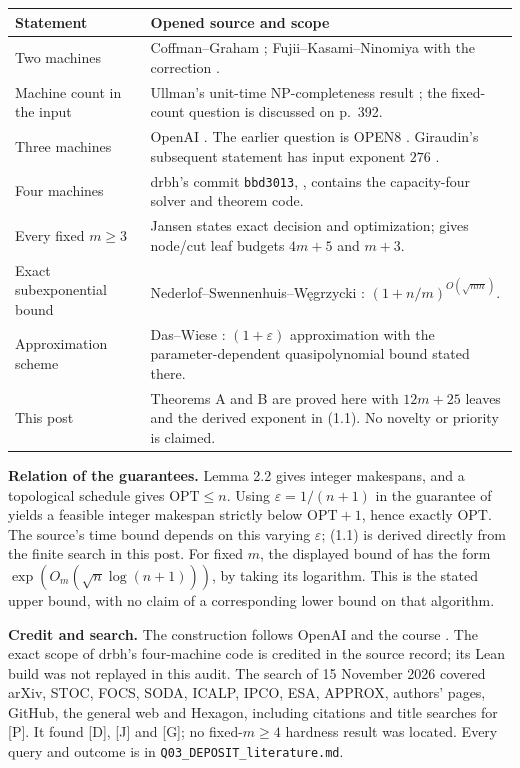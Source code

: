 \noindent\begin{tabularx}{\linewidth}{@{}L{4.0cm}Y@{}}
\toprule
Statement & Opened source and scope\\
\midrule
Two machines & Coffman--Graham \cite[Theorem~1, p.~203]{CG}; Fujii--Kasami--Ninomiya \cite[abstract]{FKN} with the correction \cite[p.~141]{FKNe}.\\[2pt]
Machine count in the input & Ullman's unit-time NP-completeness result \cite[Theorem~1, p.~389]{U}; the fixed-count question is discussed on p.~392.\\[2pt]
Three machines & OpenAI \cite[Theorem~1.1]{P}. The earlier question is OPEN8 \cite[Appendix A13, p.~287]{GJ}. Giraudin's subsequent statement has input exponent $276$ \cite[Theorem~1]{G}.\\[2pt]
Four machines & drbh's commit \texttt{bbd3013}, \cite[\texttt{Model.lean}, \texttt{ReleaseTheorem}; \texttt{Main.lean}, \texttt{main\_theorem}]{D}, contains the capacity-four solver and theorem code.\\[2pt]
Every fixed $m\geq3$ & Jansen \cite[Theorem~1.1]{J} states exact decision and optimization; \cite[Lemma~7.15]{J} gives node/cut leaf budgets $4m+5$ and $m+3$.\\[2pt]
Exact subexponential bound & Nederlof--Swennenhuis--W\k{e}grzycki \cite[Theorem~1.1]{N}: $(1+n/m)^{O(\sqrt{nm})}$.\\[2pt]
Approximation scheme & Das--Wiese \cite[Theorem~1]{A}: $(1+\varepsilon)$ approximation with the parameter-dependent quasipolynomial bound stated there.\\[2pt]
This post & Theorems A and B are proved here with $12m+25$ leaves and the derived exponent in (1.1). No novelty or priority is claimed.\\
\bottomrule
\end{tabularx}

\smallskip
\noindent\textbf{Relation of the guarantees.}
Lemma 2.2 gives integer makespans, and a topological schedule gives $\mathrm{OPT}\leq n$.
Using $\varepsilon=1/(n+1)$ in the guarantee of \cite[Theorem~1]{A} yields a feasible integer makespan strictly below $\mathrm{OPT}+1$, hence exactly $\mathrm{OPT}$.
The source's time bound depends on this varying $\varepsilon$; (1.1) is derived directly from the finite search in this post.
For fixed $m$, the displayed bound of \cite[Theorem~1.1]{N} has the form $\exp(O_m(\sqrt n\log(n+1)))$, by taking its logarithm. This is the stated upper bound, with no claim of a corresponding lower bound on that algorithm.

\smallskip
\noindent\textbf{Credit and search.}
The construction follows OpenAI \cite[Sections 2--9]{P} and the course \cite[lessons 1--8]{L}.
The exact scope of drbh's four-machine code is credited in the source record; its Lean build was not replayed in this audit.
The search of 15 November 2026 covered arXiv, STOC, FOCS, SODA, ICALP, IPCO, ESA, APPROX, authors' pages, GitHub, the general web and Hexagon, including citations and title searches for [P]. It found [D], [J] and [G]; no fixed-$m\geq4$ hardness result was located. Every query and outcome is in \texttt{Q03\_DEPOSIT\_literature.md}.
